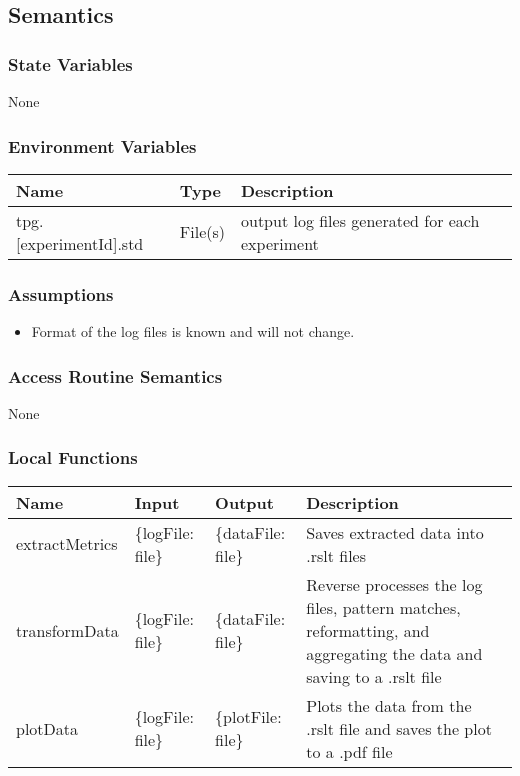 \documentclass[12pt, titlepage]{article}
\begin{document}
\subsection{Semantics}

\subsubsection{State Variables}
None

\subsubsection{Environment Variables}

  \begin{center}
    \begin{tabular}{p{4cm} p{4cm} p{4cm}}
    \hline
    \textbf{Name} & \textbf{Type} & \textbf{Description} \\
    \hline
    tpg.[experimentId].std & File(s) & output log files generated for each experiment \\
    \hline
    \end{tabular}
    \end{center}

\subsubsection{Assumptions}

\begin{itemize}
  \item Format of the log files is known and will not change.
\end{itemize}
\subsubsection{Access Routine Semantics}
None

\subsubsection{Local Functions}

\begin{center}
  \begin{tabular}{p{3cm} p{3cm} p{4cm} p{5cm}}
  \hline
  \textbf{Name} & \textbf{Input} & \textbf{Output} & \textbf{Description} \\
  \hline
  extractMetrics & \{logFile: file\} & \{dataFile: file\} & Saves extracted data into .rslt files \\
  \hline
  transformData & \{logFile: file\} & \{dataFile: file\} & Reverse processes the log files, pattern matches, reformatting, and aggregating the data and saving to a .rslt file \\
  \hline
  plotData & \{logFile: file\} & \{plotFile: file\} & Plots the data from the .rslt file and saves the plot to a .pdf file \\
  \end{tabular}
\end{center}
\end{document}
